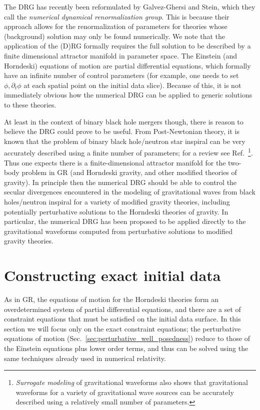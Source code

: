 \documentclass{ws-ijmpd}
\begin{document}
The DRG has recently been reformulated 
by Galvez-Ghersi and Stein\cite{GalvezGhersi:2021sxs},
which they call the \emph{numerical dynamical
renormalization group}.
This is because their approach allows for the renormalization
of parameters for theories whose (background) 
solution may only be found numerically.
We note that the application of the (D)RG formally requires the full
solution to be described by 
a finite dimensional attractor manifold in parameter space.
The Einstein (and Horndeski) equations of motion are partial differential
equations, which formally have an infinite number of control parameters
(for example, one needs to set $\phi,\partial_t\phi$ at each spatial point
on the initial data slice).
Because of this, it is not
immediately obvious how the numerical DRG can be applied to generic
solutions to these theories.

At least in the context of binary black hole mergers though, 
there is reason to believe the DRG could prove to be useful.
From Post-Newtonian theory, it is known
that the problem of binary black hole/neutron star inspiral
can be very accurately described using a finite number of 
parameters; for a review see 
Ref.~\footnote{\emph{Surrogate modeling} 
of gravitational waveforms 
also shows that gravitational waveforms for a variety of gravitational wave
sources can be accurately described using a relatively small 
number of parameters\cite{Tiglio:2021ysj}.}.
Thus one expects there is a finite-dimensional attractor manifold
for the two-body problem in GR (and Horndeski gravity, and other
modified theories of gravity).
In principle then the numerical DRG should 
be able to control the secular divergences
encountered in the modeling of gravitational waves from black holes/neutron
inspiral for a variety of modified gravity theories, including potentially
perturbative solutions to the Horndeski theories of gravity.
In particular,
the numerical DRG has been proposed to be applied directly to the 
gravitational waveforms
computed from perturbative solutions to 
modified gravity theories\cite{GalvezGhersi:2021sxs}.

\section{Constructing exact initial data
\label{sec:constructing_initial_data}
}

As in GR, the equations of motion for the
Horndeski theories form an overdetermined
system of partial differential equations,
and there are a set of constraint equations that must be satisfied
on the initial data surface.
In this section we will focus only on the exact constraint equations;
the perturbative equations of motion 
(Sec.~\ref{sec:perturbative_well_posedness}) reduce to those
of the Einstein equations plus lower order terms, and thus can
be solved using the same techniques already used in numerical
relativity\cite{Cook:2000vr}.
\end{document}
